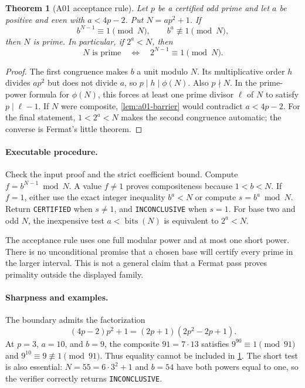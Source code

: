 \documentclass[11pt,a4paper]{article}
\newtheorem{theorem}{Theorem}[section]
\theoremstyle{definition}\newtheorem{definition}[theorem]{Definition}
\theoremstyle{remark}\newtheorem{remark}[theorem]{Remark}
\newcommand{\bits}{\operatorname{bits}}\newcommand{\Norm}{\operatorname{N}}
\begin{document}
\begin{theorem}[A01 acceptance rule]\label{thm:a01}
Let $p$ be a certified odd prime and let $a$ be positive and even with
$a<4p-2$. Put $N=ap^2+1$. If
\begin{equation}\label{eq:a01-tests}
 b^{N-1}\equiv1\pmod N,
 \qquad b^a\not\equiv1\pmod N,
\end{equation}
then $N$ is prime. In particular, if $2^a<N$, then
\[
 N\text{ is prime}\quad\Longleftrightarrow\quad
 2^{N-1}\equiv1\pmod N.
\]
\end{theorem}
\begin{proof}
The first congruence makes $b$ a unit modulo $N$. Its multiplicative order
$h$ divides $ap^2$ but does not divide $a$, so $p\mid h\mid\phi(N)$.
Also $p\nmid N$. In the prime-power formula for $\phi(N)$, this forces at
least one prime divisor $\ell$ of $N$ to satisfy $p\mid\ell-1$.
If $N$ were composite, \cref{lem:a01-barrier} would contradict $a<4p-2$.
For the final statement, $1<2^a<N$ makes the second congruence automatic;
the converse is Fermat's little theorem.
\end{proof}

\paragraph{Executable procedure.}
Check the input proof and the strict coefficient bound. Compute
$f=b^{N-1}\bmod N$. A value $f\ne1$ proves compositeness because
$1<b<N$. If $f=1$, either use the exact integer inequality $b^a<N$ or
compute $s=b^a\bmod N$. Return \texttt{CERTIFIED} when $s\ne1$, and
\texttt{INCONCLUSIVE} when $s=1$. For base two and odd $N$, the inexpensive
test $a<\bits(N)$ is equivalent to $2^a<N$.

The acceptance rule uses one full modular power and at most one short power.
There is no unconditional promise that a chosen base will certify every prime
in the larger interval. This is not a general claim that a Fermat pass proves
primality outside the displayed family.

\paragraph{Sharpness and examples.}
The boundary admits the factorization
\[
 (4p-2)p^2+1=(2p+1)(2p^2-2p+1).
\]
At $p=3$, $a=10$, and $b=9$, the composite $91=7\cdot13$ satisfies
$9^{90}\equiv1\pmod{91}$ and $9^{10}\equiv9\not\equiv1\pmod{91}$.
Thus equality cannot be included in \cref{thm:a01}. The short test is also
essential: $N=55=6\cdot3^2+1$ and $b=54$ have both powers equal to one,
so the verifier correctly returns \texttt{INCONCLUSIVE}.
\end{document}
